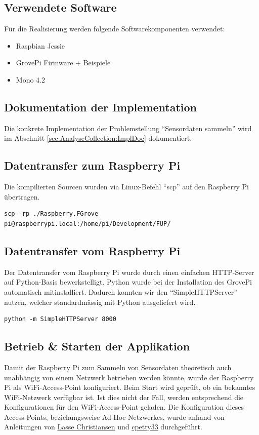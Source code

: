 \subsection{Verwendete Software}
Für die Realisierung werden folgende Softwarekomponenten verwendet:

\begin{itemize}
\item Raspbian Jessie
\item GrovePi Firmware + Beispiele
\item Mono 4.2
\end{itemize}

\subsection{Dokumentation der Implementation}
Die konkrete Implementation der Problemstellung "`Sensordaten sammeln"' wird im Abschnitt \ref{sec:AnalyseCollection:ImplDoc}  dokumentiert.

\subsection{Datentransfer zum Raspberry Pi}
Die kompilierten Sourcen wurden via Linux-Befehl "`scp"' auf den Raspberry Pi übertragen.

\begin{lstlisting}
scp -rp ./Raspberry.FGrove pi@raspberrypi.local:/home/pi/Development/FUP/
\end{lstlisting}

\subsection{Datentransfer vom Raspberry Pi}
Der Datentransfer vom Raspberry Pi wurde durch einen einfachen HTTP-Server auf Python-Basis bewerkstelligt. Python wurde bei der Installation des GrovePi automatisch mitinstalliert. Dadurch konnten wir den "`SimpleHTTPServer"' nutzen, welcher standardmässig mit Python ausgeliefert wird.

\begin{lstlisting}
python -m SimpleHTTPServer 8000
\end{lstlisting}


\subsection{Betrieb \& Starten der Applikation}
Damit der Raspberry Pi zum Sammeln von Sensordaten theoretisch auch unabhängig von einem Netzwerk betrieben werden könnte, wurde der Raspberry Pi als WiFi-Access-Point konfiguriert. Beim Start wird geprüft, ob ein bekanntes WiFi-Netzwerk verfügbar ist. Ist dies nicht der Fall, werden entsprechend die Konfigurationen für den WiFi-Access-Point geladen. Die Konfiguration dieses Access-Points, beziehungsweise Ad-Hoc-Netzwerkes, wurde anhand von Anleitungen von \hyperlink{http://lcdev.dk/2012/11/18/raspberry-pi-tutorial-connect-to-wifi-or-create-an-encrypted-dhcp-enabled-ad-hoc-network-as-fallback/}{Lasse Christiansen} und \hyperlink{http://slicepi.com/creating-an-ad-hoc-network-for-your-raspberry-pi/}{cpetty33} durchgeführt.


